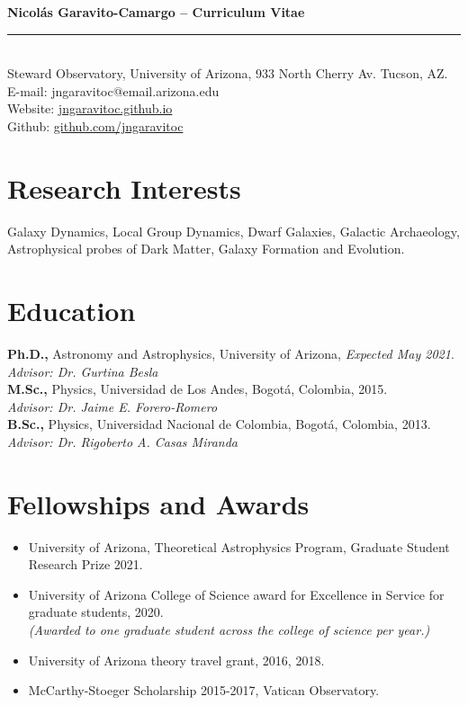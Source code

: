 \documentclass[UTF8]{article}
\begin{document}
\indent \textbf{\LARGE Nicol\'as Garavito-Camargo -- Curriculum Vitae} \\
\indent \rule{17cm}{0.4pt}\\

\noindent Steward Observatory, University of Arizona, 933 North Cherry Av. Tucson, AZ.\\
E-mail: jngaravitoc@email.arizona.edu\\ 
Website: \href{http://jngaravitoc.github.io/Garavito-Camargo}{jngaravitoc.github.io}\\
Github: \href{http://www.github.com/jngaravitoc}{github.com/jngaravitoc}\\
\section*{Research Interests}
Galaxy Dynamics, Local Group Dynamics, Dwarf Galaxies, Galactic
Archaeology, Astrophysical probes of Dark Matter, Galaxy Formation and Evolution.

\section*{Education}
\textbf{Ph.D.,} Astronomy and Astrophysics, University of Arizona, \textit{Expected May 2021}.\\
\indent \textit{Advisor: Dr. Gurtina Besla}\\
\textbf{M.Sc.,}  Physics, Universidad de Los Andes, Bogot\'a, Colombia, 2015.\\
\indent \textit{Advisor: Dr. Jaime E. Forero-Romero}\\
\textbf{B.Sc.,} Physics, Universidad Nacional de Colombia, Bogot\'a, Colombia, 2013.\\
\indent \textit{Advisor: Dr. Rigoberto A. Casas Miranda}

\section*{Fellowships and Awards}


\begin{itemize}
  \setlength\itemsep{0.0em}
  \renewcommand\labelitemi{$\cdot$}

\item University of Arizona, Theoretical Astrophysics Program, Graduate Student
Research Prize 2021.
\item University of Arizona College of Science award for Excellence in
Service for graduate students, 2020.\\ 
\indent \textit{(Awarded to one graduate student across the college of
science per year.)}
\item University of Arizona theory travel grant, 2016, 2018. 
\item McCarthy-Stoeger Scholarship 2015-2017, Vatican Observatory.
\end{itemize}
\end{document}
